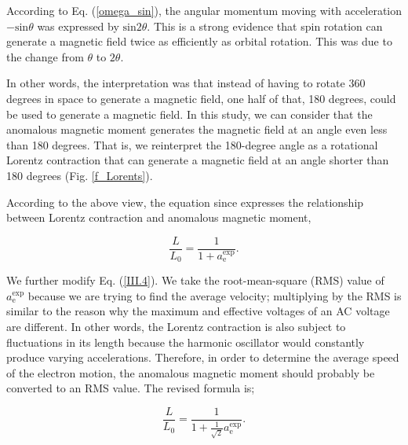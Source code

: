 \documentclass[%
 reprint,
 amsmath,amssymb,
 aps,
]{revtex4-1}
\numberwithin{equation}{section}%
\begin{document}
According to Eq. (\ref{omega_sin}), the angular momentum moving with acceleration $\mathrm{-sin}\theta$ was expressed by $\mathrm{sin}2\theta$. This is a strong evidence that spin rotation can generate a magnetic field twice as efficiently as orbital rotation. This was due to the change from $\theta$ to $2\theta$.

In other words, the interpretation was that instead of having to rotate 360 degrees in space to generate a magnetic field, one half of that, 180 degrees, could be used to generate a magnetic field. In this study, we can consider that the anomalous magnetic moment generates the magnetic field at an angle even less than 180 degrees. That is, we reinterpret the 180-degree angle as a rotational Lorentz contraction that can generate a magnetic field at an angle shorter than 180 degrees (Fig. \ref{f_Lorents}).

According to the above view, the equation since expresses the relationship between Lorentz contraction and anomalous magnetic moment,

    \begin{equation}
        \frac{L}{L_0} = \frac{1}{1 + a^{\text{exp}}_{\text{e}}} .
        \label{III.4}
    \end{equation}




We further modify Eq. (\ref{III.4}). We take the root-mean-square (RMS) value of $a^{\text{exp}}_{\text{e}}$ because we are trying to find the average velocity; multiplying by the RMS is similar to the reason why the maximum and effective voltages of an AC voltage are different. In other words, the Lorentz contraction is also subject to fluctuations in its length because the harmonic oscillator would constantly produce varying accelerations. Therefore, in order to determine the average speed of the electron motion, the anomalous magnetic moment should probably be converted to an RMS value. The revised formula is;

    \begin{equation}
        \frac{L}{L_0} = \frac{1}{1 + \frac{1}{\sqrt{2}}a^{\text{exp}}_{\text{e}}} .
        \label{III.5}
    \end{equation}
\end{document}
